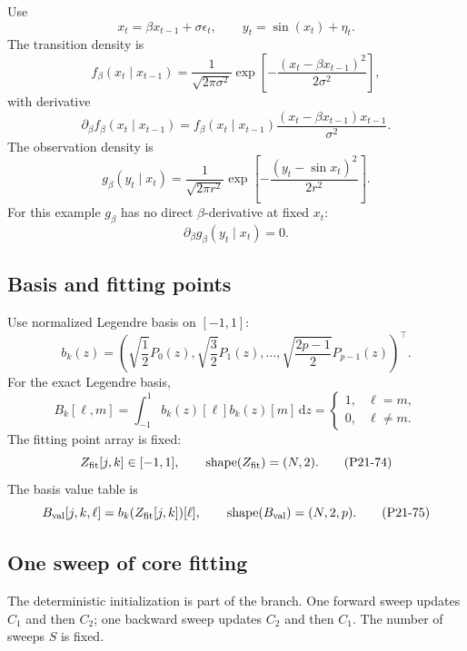 \documentclass[11pt]{article}
\newcommand{\dd}{\,\mathrm d}
\newcommand{\shape}{\operatorname{shape}}
\begin{document}
Use
\[
    x_t=\beta x_{t-1}+\sigma\epsilon_t,\qquad
    y_t=\sin(x_t)+\eta_t.
    \tag{P21-67}
\]
The transition density is
\[
    f_\beta(x_t\mid x_{t-1})
    =
    \frac{1}{\sqrt{2\pi\sigma^2}}
    \exp\left[
    -\frac{(x_t-\beta x_{t-1})^2}{2\sigma^2}
    \right],
    \tag{P21-68}
\]
with derivative
\[
    \partial_\beta f_\beta(x_t\mid x_{t-1})
    =
    f_\beta(x_t\mid x_{t-1})
    \frac{(x_t-\beta x_{t-1})x_{t-1}}{\sigma^2}.
    \tag{P21-69}
\]
The observation density is
\[
    g_\beta(y_t\mid x_t)
    =
    \frac{1}{\sqrt{2\pi r^2}}
    \exp\left[-\frac{(y_t-\sin x_t)^2}{2r^2}\right].
    \tag{P21-70}
\]
For this example \(g_\beta\) has no direct \(\beta\)-derivative at fixed
\(x_t\):
\[
    \partial_\beta g_\beta(y_t\mid x_t)=0.
    \tag{P21-71}
\]

\subsection{Basis and fitting points}

Use normalized Legendre basis on \([-1,1]\):
\[
    b_k(z)
    =
    \left(
    \sqrt{\frac12}P_0(z),\sqrt{\frac32}P_1(z),\ldots,
    \sqrt{\frac{2p-1}{2}}P_{p-1}(z)
    \right)^\top.
    \tag{P21-72}
\]
For the exact Legendre basis,
\[
    B_k[\ell,m]=\int_{-1}^{1}b_k(z)[\ell]b_k(z)[m]\dd z
    =
    \begin{cases}
    1,&\ell=m,\\
    0,&\ell\ne m.
    \end{cases}
    \tag{P21-73}
\]
The fitting point array is fixed:
\[
    Z_{\rm fit}[j,k]\in[-1,1],
    \qquad
    \shape(Z_{\rm fit})=(N,2).
    \tag{P21-74}
\]
The basis value table is
\[
    B_{\rm val}[j,k,\ell]=b_k(Z_{\rm fit}[j,k])[\ell],
    \qquad
    \shape(B_{\rm val})=(N,2,p).
    \tag{P21-75}
\]

\subsection{One sweep of core fitting}

The deterministic initialization is part of the branch.  One forward sweep
updates \(C_1\) and then \(C_2\); one backward sweep updates \(C_2\) and then
\(C_1\).  The number of sweeps \(S\) is fixed.
\end{document}
